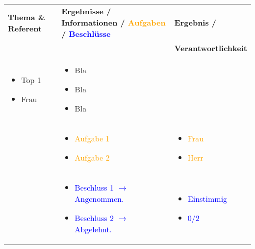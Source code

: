 \documentclass[11pt,a4paper]{article}
\begin{document}
	\begin{longtable}{|p{3.4cm}|p{\dimexpr\textwidth-6.8cm}|p{3.4cm}|}
		\hline
		\rowcolor[gray]{0.9} %
		\textbf{\large Thema \& Referent} & \textbf{\large Ergebnisse / Informationen / \textcolor{orange}{Aufgaben} / \textcolor{blue}{Beschlüsse}} & \textbf{\large Ergebnis / }\\
		\rowcolor[gray]{0.9}
		& & \textbf{\large Verantwortlichkeit} \\
		\hline
		
		\begin{itemize}[label={},leftmargin=*]
			\item Top 1
			\item Frau
		\end{itemize} & \begin{itemize}
			\item Bla
			\item Bla
			\item Bla
		\end{itemize} & \\
		
		& \begin{itemize}[label=\textcolor{orange}{$\rightarrow$}]
			\item \textcolor{orange}{Aufgabe 1}
			\item \textcolor{orange}{Aufgabe 2}
		\end{itemize} & \begin{itemize}[label={},leftmargin=*]
			\item \textcolor{orange}{Frau}
			\item \textcolor{orange}{Herr}
		\end{itemize} \\
		
		& \begin{itemize}[label=\textcolor{blue}{$\rightarrow$}]
			\item \textcolor{blue}{Beschluss 1 $\rightarrow$ Angenommen.}
			\item \textcolor{blue}{Beschluss 2 $\rightarrow$ Abgelehnt.}
		\end{itemize} & \begin{itemize}[label={},leftmargin=*]
			\item \textcolor{blue}{Einstimmig}
			\item \textcolor{blue}{0/2}
		\end{itemize} \\
		\hline
		

\end{longtable}
\end{document}
